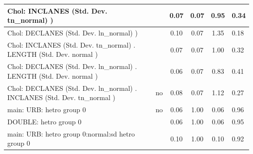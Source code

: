 \begin{table}
\begin{center}
\begin{tabular}{|l|l|c|c|c|l|}
			\hline
			 Chol: INCLANES (Std. Dev. tn_normal) ) &  & 0.07 & 0.07 & 0.95 & 0.34 \\
			\hline
			 Chol: DECLANES (Std. Dev. ln_normal) ) &  & 0.10 & 0.07 & 1.35 & 0.18 \\
			\hline
			 Chol: INCLANES (Std. Dev. tn_normal) . LENGTH (Std. Dev.   normal ) &  & 0.07 & 0.07 & 1.00 & 0.32 \\
			\hline
			 Chol: DECLANES (Std. Dev. ln_normal) . LENGTH (Std. Dev.   normal ) &  & 0.06 & 0.07 & 0.83 & 0.41 \\
			\hline
			 Chol: DECLANES (Std. Dev. ln_normal) . INCLANES (Std. Dev.   tn_normal ) & no & 0.08 & 0.07 & 1.12 & 0.27 \\
			\hline
			main: URB: hetro group 0 & no & 0.06 & 1.00 & 0.06 & 0.96 \\
			\hline
			DOUBLE: hetro group 0 &  & 0.06 & 1.00 & 0.06 & 0.95 \\
			\hline
			main: URB: hetro group 0:normal:sd  hetro group 0 &  & 0.10 & 1.00 & 0.10 & 0.92 \\
			\hline
		\end{tabular}
	\end{center}
\end{table}